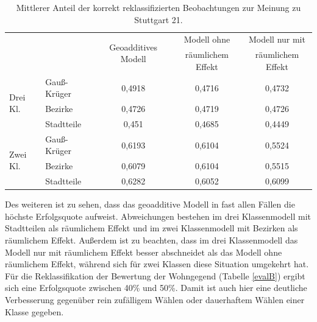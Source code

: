 \documentclass{Vorlage}
\begin{document}
\begin{table}[h]
\centering
\caption{Mittlerer Anteil der korrekt reklassifizierten Beobachtungen zur Meinung zu Stuttgart 21.}
\label{evalS21}
\begin{tabular}{ll|c|c|c}
\hline \hline
                          &              & \multirow{2}{*}{Geoadditives Modell} & Modell ohne       & Modell nur mit    \\
                          &              &                                      & räumlichem Effekt & räumlichem Effekt \\ \hline
\multirow{3}{*}{Drei Kl.} & Gauß-Krüger & 0,4918                               & 0,4716            & 0,4732            \\
                          & Bezirke      & 0,4726                               & 0,4719            & 0,4726            \\
                          & Stadtteile   & 0,451                                & 0,4685            & 0,4449            \\ \hline
\multirow{3}{*}{Zwei Kl.} & Gauß-Krüger & 0,6193                               & 0,6104            & 0,5524            \\
                          & Bezirke      & 0,6079                               & 0,6104            & 0,5515            \\
                          & Stadtteile   & 0,6282                               & 0,6052            & 0,6099            \\ \hline \hline
\end{tabular}
\end{table}

Des weiteren ist zu sehen, dass das geoadditive Modell in fast allen Fällen die höchste Erfolgsquote aufweist. Abweichungen bestehen im drei Klassenmodell mit Stadtteilen als räumlichem Effekt und im zwei Klassenmodell mit Bezirken als räumlichem Effekt. Außerdem ist zu beachten, dass im drei Klassenmodell das Modell nur mit räumlichem Effekt besser abschneidet als das Modell ohne räumlichem Effekt, während sich für zwei Klassen diese Situation umgekehrt hat.\\
Für die Reklassifikation der Bewertung der Wohngegend (Tabelle \ref{evalB}) ergibt sich eine Erfolgsquote zwischen 40\% und 50\%. Damit ist auch hier eine deutliche Verbesserung gegenüber rein zufälligem Wählen oder dauerhaftem Wählen einer Klasse gegeben. 
\end{document}
